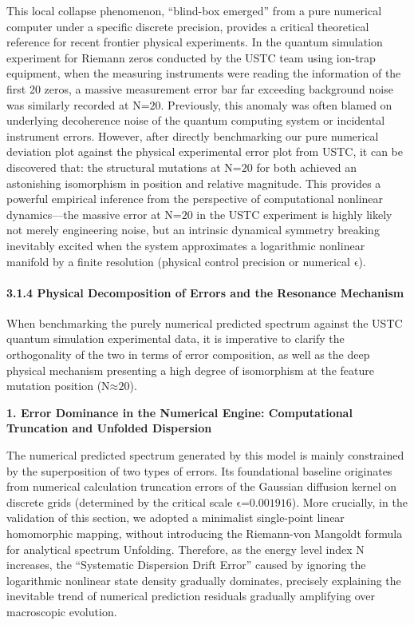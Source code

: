 This local collapse phenomenon, ``blind-box emerged'' from a pure
numerical computer under a specific discrete precision, provides a
critical theoretical reference for recent frontier physical experiments.
In the quantum simulation experiment for Riemann zeros conducted by the
USTC team using ion-trap equipment, when the measuring instruments were
reading the information of the first 20 zeros, a massive measurement
error bar far exceeding background noise was similarly recorded at
\(\text{N}\text{=20}\). Previously, this anomaly was often blamed on
underlying decoherence noise of the quantum computing system or
incidental instrument errors. However, after directly benchmarking our
pure numerical deviation plot against the physical experimental error
plot from USTC, it can be discovered that: the structural mutations at
\(\text{N}\text{=20}\) for both achieved an astonishing isomorphism in
position and relative magnitude. This provides a powerful empirical
inference from the perspective of computational nonlinear dynamics---the
massive error at \(\text{N}\text{=20}\) in the USTC experiment is highly
likely not merely engineering noise, but an intrinsic dynamical symmetry
breaking inevitably excited when the system approximates a logarithmic
nonlinear manifold by a finite resolution (physical control precision or
numerical \(\text{ϵ}\)).

\hypertarget{physical-decomposition-of-errors-and-the-resonance-mechanism}{%
\paragraph{3.1.4 Physical Decomposition of Errors and the Resonance
Mechanism}\label{physical-decomposition-of-errors-and-the-resonance-mechanism}}

When benchmarking the purely numerical predicted spectrum against the
USTC quantum simulation experimental data, it is imperative to clarify
the orthogonality of the two in terms of error composition, as well as
the deep physical mechanism presenting a high degree of isomorphism at
the feature mutation position (\(\text{N}\text{≈20}\)).

\textbf{1. Error Dominance in the Numerical Engine: Computational
Truncation and Unfolded Dispersion}

The numerical predicted spectrum generated by this model is mainly
constrained by the superposition of two types of errors. Its
foundational baseline originates from numerical calculation truncation
errors of the Gaussian diffusion kernel on discrete grids (determined by
the critical scale \(\text{ϵ=0.001916}\)). More crucially, in the
validation of this section, we adopted a minimalist single-point linear
homomorphic mapping, without introducing the Riemann-von Mangoldt
formula for analytical spectrum Unfolding. Therefore, as the energy
level index \(\text{N}\) increases, the ``Systematic Dispersion Drift
Error'' caused by ignoring the logarithmic nonlinear state density
gradually dominates, precisely explaining the inevitable trend of
numerical prediction residuals gradually amplifying over macroscopic
evolution.

